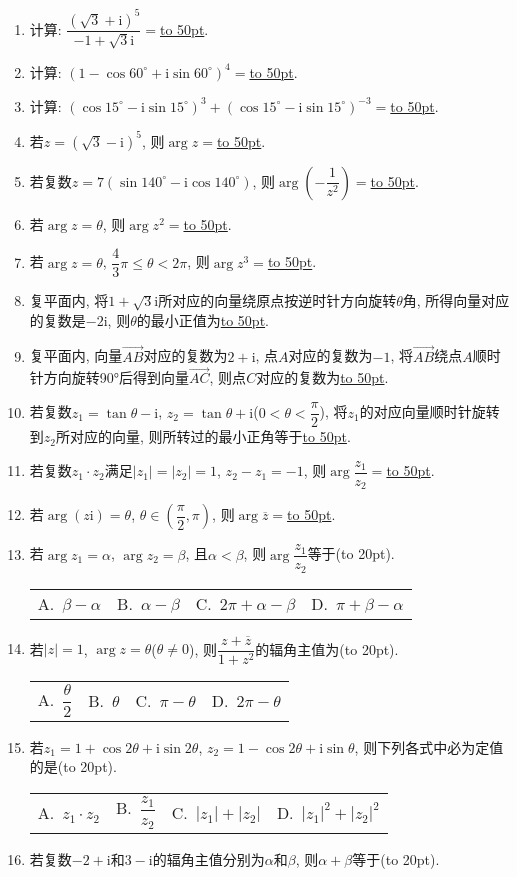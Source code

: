 \documentclass[10pt,a4paper]{article}
\newcommand{\blank}[1]{\underline{\hbox to #1pt{}}}
\newcommand{\bracket}[1]{(\hbox to #1pt{})}
\newcommand{\fourch}[4]{\par\begin{tabular}{p{.23\textwidth}p{.23\textwidth}p{.23\textwidth}p{.23\textwidth}}
A.~#1 &B.~#2& C.~#3& D.~#4
\end{tabular}}
\begin{document}
\begin{enumerate}[1.]
\item 计算: $\dfrac{(\sqrt 3+\mathrm{i})^5}{-1+\sqrt 3\mathrm{i}}=$\blank{50}.
\item 计算: $(1-\cos 60^\circ+\mathrm{i}\sin 60^\circ)^4=$\blank{50}.
\item 计算: $(\cos 15^\circ -\mathrm{i}\sin 15^\circ)^3+(\cos 15^\circ -\mathrm{i}\sin 15^\circ)^{-3}=$\blank{50}.
\item 若$z=(\sqrt 3-\mathrm{i})^5$, 则$\arg z=$\blank{50}.
\item 若复数$z=7(\sin 140^\circ -\mathrm{i}\cos 140^\circ)$, 则$\arg (-\dfrac 1{z^2})=$\blank{50}.
\item 若$\arg z=\theta$, 则$\arg z^2=$\blank{50}.
\item 若$\arg z=\theta$, $\dfrac 43\pi \le \theta <2\pi$, 则$\arg z^3=$\blank{50}.
\item 复平面内, 将$1+\sqrt 3\mathrm{i}$所对应的向量绕原点按逆时针方向旋转$\theta$角, 所得向量对应的复数是$-2\mathrm{i}$, 则$\theta$的最小正值为\blank{50}.
\item 复平面内, 向量$\overrightarrow{AB}$对应的复数为$2+\mathrm{i}$, 点$A$对应的复数为$-1$, 将$\overrightarrow{AB}$绕点$A$顺时针方向旋转90°后得到向量$\overrightarrow{AC}$, 则点$C$对应的复数为\blank{50}.
\item 若复数$z_1=\tan \theta -\mathrm{i}$, $z_2=\tan \theta +\mathrm{i}$($0<\theta <\dfrac{\pi }2$), 将$z_1$的对应向量顺时针旋转到$z_2$所对应的向量, 则所转过的最小正角等于\blank{50}.
\item 若复数$z_1\cdot z_2$满足$|z_1|=|z_2|=1$, $z_2-z_1=-1$, 则$\arg \dfrac{z_1}{z_2}=$\blank{50}.
\item 若$\arg (z\mathrm{i})=\theta$, $\theta \in (\dfrac{\pi }2,\pi)$, 则$\arg \overline z=$\blank{50}.
\item 若$\arg z_1=\alpha$, $\arg z_2=\beta$, 且$\alpha <\beta$, 则$\arg \dfrac{z_1}{z_2}$等于\bracket{20}.
\fourch{$\beta -\alpha$}{$\alpha -\beta$}{$2\pi +\alpha -\beta$}{$\pi +\beta -\alpha$}
\item 若$|z|=1$, $\arg z=\theta$($\theta \ne 0$), 则$\dfrac{z+\overline z}{1+{z^2}}$的辐角主值为\bracket{20}.
\fourch{$\dfrac{\theta }2$}{$\theta$}{$\pi -\theta$}{$2\pi -\theta$}
\item 若$z_1=1+\cos 2\theta +\mathrm{i}\sin 2\theta$, $z_2=1-\cos 2\theta +\mathrm{i}\sin \theta$, 则下列各式中必为定值的是\bracket{20}.
\fourch{$z_1\cdot z_2$}{$\dfrac{z_1}{z_2}$}{$|z_1|+|z_2|$}{$|z_1|^2+|z_2|^2$}
\item 若复数$-2+\mathrm{i}$和$3-\mathrm{i}$的辐角主值分别为$\alpha$和$\beta$, 则$\alpha +\beta$等于\bracket{20}.

\end{enumerate}
\end{document}
